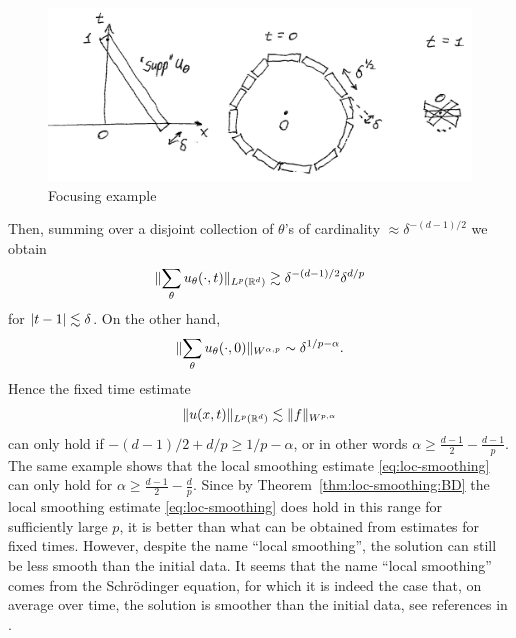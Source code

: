 \begin{figure}
\begin{center}
\includegraphics[width=\textwidth]{focusing-example.png}
\end{center}
\caption{Focusing example}
\end{figure}

Then, summing over a disjoint collection of $\theta$'s of cardinality $\approx \delta^{-(d-1)/2}$ we obtain
\[
\lVert\sum_{\theta}u_{\theta}(\cdot,t)\rVert_{L^{p}(\mathbb{R}^{d})} \gtrsim \delta^{-(d-1)/2} \delta^{d/p}
\]
for $\lvert t-1\rvert \lesssim \delta$.
On the other hand,
\[
\lVert\sum_{\theta}u_{\theta}(\cdot,0)\rVert_{W^{\alpha,p}}
\sim
\delta^{1/p-\alpha}.
\]
Hence the fixed time estimate
\[
\lVert u(x,t)\rVert_{L^{p}(\mathbb{R}^{d})}
\lesssim
\lVert f\rVert_{W^{p,\alpha}}
\]
can only hold if $-(d-1)/2 + d/p \geq 1/p-\alpha$, or in other words $\alpha \geq \frac{d-1}{2} - \frac{d-1}{p}$.
The same example shows that the local smoothing estimate \eqref{eq:loc-smoothing} can only hold for $\alpha \geq \frac{d-1}{2} - \frac{d}{p}$.
Since by Theorem~\ref{thm:loc-smoothing:BD} the local smoothing estimate \eqref{eq:loc-smoothing} does hold in this range for sufficiently large $p$, it is better than what can be obtained from estimates for fixed times.
However, despite the name ``local smoothing'', the solution can still be less smooth than the initial data.
It seems that the name ``local smoothing'' comes from the Schr\"odinger equation, for which it is indeed the case that, on average over time, the solution is smoother than the initial data, see references in \cite{MR2456277}.

